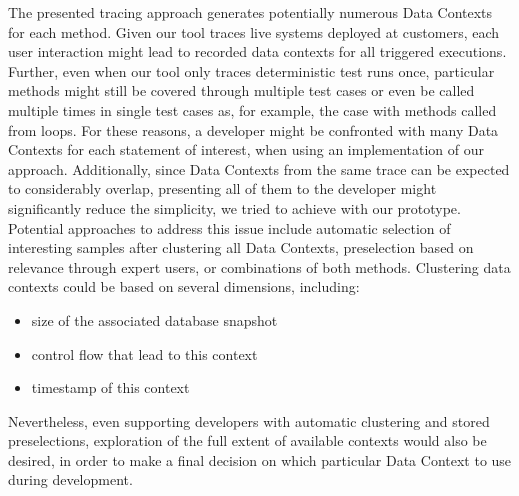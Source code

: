 The presented tracing approach generates potentially numerous Data Contexts for each method.
Given our tool traces live systems deployed at customers, each user interaction might lead to recorded data contexts for all triggered executions.
Further, even when our tool only traces deterministic test runs once, particular methods might still be covered through multiple test cases or even be called multiple times in single test cases as, for example, the case with methods called from loops.
For these reasons, a developer might be confronted with many Data Contexts for each statement of interest, when using an implementation of our approach.
Additionally, since Data Contexts from the same trace can be expected to considerably overlap, presenting all of them to the developer might significantly reduce the simplicity, we tried to achieve with our prototype.
Potential approaches to address this issue include automatic selection of interesting samples after clustering all Data Contexts, preselection based on relevance through expert users, or combinations of both methods.
Clustering data contexts could be based on several dimensions, including:
\begin{itemize}
  \item size of the associated database snapshot
  \item control flow that lead to this context
  \item timestamp of this context
\end{itemize}
Nevertheless, even supporting developers with automatic clustering and stored preselections, exploration of the full extent of available contexts would also be desired, in order to make a final decision on which particular Data Context to use during development.
